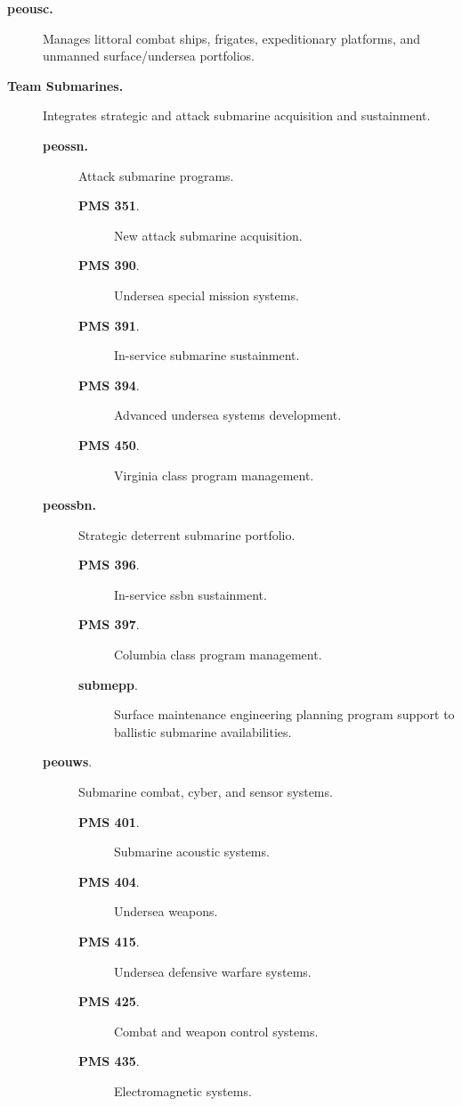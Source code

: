 \documentclass[../main.tex]{subfiles}
\begin{document}
\begin{refsegment}
\begin{description}
	\item[\textbf{\ac{peousc}.}] Manages littoral combat ships, frigates, expeditionary platforms, and unmanned surface/undersea portfolios.
	\item[\textbf{Team Submarines.}] Integrates strategic and attack submarine acquisition and sustainment.
      \begin{description}
        \item[\textbf{\ac{peossn}.}] Attack submarine programs.
              \begin{description}
                \item[\textbf{PMS 351}.] New attack submarine acquisition.
                \item[\textbf{PMS 390}.] Undersea special mission systems.
                \item[\textbf{PMS 391}.] In-service submarine sustainment.
                \item[\textbf{PMS 394}.] Advanced undersea systems development.
                \item[\textbf{PMS 450}.] Virginia class program management.
              \end{description}
        \item[\textbf{\ac{peossbn}.}] Strategic deterrent submarine portfolio.
              \begin{description}
                \item[\textbf{PMS 396}.] In-service \ac{ssbn} sustainment.
                \item[\textbf{PMS 397}.] Columbia class program management.
                \item[\textbf{\ac{submepp}}.] Surface maintenance engineering planning program support to ballistic submarine availabilities.
              \end{description}
        \item[\textbf{\ac{peouws}}.] Submarine combat, cyber, and sensor systems.
              \begin{description}
                \item[\textbf{PMS 401}.] Submarine acoustic systems.
                \item[\textbf{PMS 404}.] Undersea weapons.
                \item[\textbf{PMS 415}.] Undersea defensive warfare systems.
                \item[\textbf{PMS 425}.] Combat and weapon control systems.
                \item[\textbf{PMS 435}.] Electromagnetic systems.

\end{description}
\end{description}
\end{description}
\end{refsegment}
\end{document}
